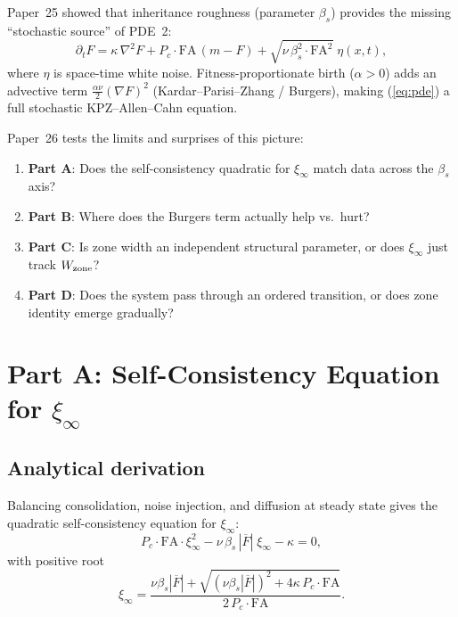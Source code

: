 \documentclass[11pt,a4paper]{article}
\begin{document}
Paper~25 showed that inheritance roughness (parameter $\beta_s$) provides
the missing ``stochastic source'' of PDE~2:
\begin{equation}
  \partial_t F = \kappa\,\nabla^2 F + P_c \cdot \mathrm{FA}\,(m - F)
               + \sqrt{\nu\,\beta_s^2 \cdot \mathrm{FA}^2}\;\eta(x,t),
  \label{eq:pde}
\end{equation}
where $\eta$ is space-time white noise.  Fitness-proportionate birth
($\alpha>0$) adds an advective term $\tfrac{\alpha\nu}{2}(\nabla F)^2$
(Kardar--Parisi--Zhang / Burgers), making (\ref{eq:pde}) a full
stochastic KPZ--Allen--Cahn equation.

Paper~26 tests the limits and surprises of this picture:
\begin{enumerate}
  \item \textbf{Part A}: Does the self-consistency quadratic for $\xi_\infty$
        match data across the $\beta_s$ axis?
  \item \textbf{Part B}: Where does the Burgers term actually help vs.\ hurt?
  \item \textbf{Part C}: Is zone width an independent structural parameter, or
        does $\xi_\infty$ just track $W_{\rm zone}$?
  \item \textbf{Part D}: Does the system pass through an ordered transition, or
        does zone identity emerge gradually?
\end{enumerate}

\section{Part A: Self-Consistency Equation for $\xi_\infty$}
\label{sec:partA}

\subsection{Analytical derivation}

Balancing consolidation, noise injection, and diffusion at steady state gives
the quadratic self-consistency equation for $\xi_\infty$:
\begin{equation}
  P_c \cdot \mathrm{FA} \cdot \xi_\infty^2
  - \nu\,\beta_s\,|\overline{F}|\;\xi_\infty
  - \kappa = 0,
  \label{eq:selfcons}
\end{equation}
with positive root
\begin{equation}
  \xi_\infty = \frac{\nu\beta_s|\overline{F}|
    + \sqrt{(\nu\beta_s|\overline{F}|)^2 + 4\kappa\,P_c\cdot\mathrm{FA}}}
    {2\,P_c\cdot\mathrm{FA}}.
  \label{eq:xipos}
\end{equation}
\end{document}
